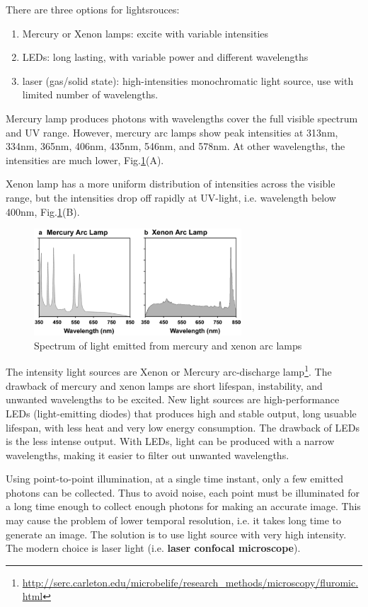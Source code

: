 There are three options for lightsrouces: 
\begin{enumerate}
  \item Mercury or Xenon lamps: excite with variable intensities
  \item LEDs: long lasting, with variable power and different wavelengths
  \item laser (gas/solid state): high-intensities monochromatic light source,
  use with limited number of wavelengths.
\end{enumerate}

Mercury lamp produces photons with wavelengths cover the full visible spectrum
and UV range. However, mercury arc lamps show peak intensities at 313nm, 334nm,
365nm, 406nm, 435nm, 546nm, and 578nm. At other wavelengths, the intensities are
much lower, Fig.\ref{fig:light_source}(A). 

Xenon lamp has a more uniform distribution of intensities across the visible
range, but the intensities drop off rapidly at UV-light, i.e. wavelength below
400nm, Fig.\ref{fig:light_source}(B). 

\begin{figure}[hbt]
  \centerline{\includegraphics[height=4cm,
    angle=0]{./images/light_source.eps}}
  \caption{Spectrum of light emitted from mercury and xenon arc lamps}
\label{fig:light_source}
\end{figure}

The intensity light sources are Xenon or Mercury arc-discharge
lamp\footnote{\url{http://serc.carleton.edu/microbelife/research_methods/microscopy/fluromic.html}}.
The drawback of mercury and xenon lamps are short lifespan, instability, and
unwanted wavelengths to be excited. New light sources are high-performance LEDs
(light-emitting diodes) that produces high and stable output, long usuable
lifespan, with less heat and very low energy consumption. The drawback of LEDs
is the less intense output. With LEDs, light can be produced with a narrow
wavelengths, making it easier to filter out unwanted wavelengths.

Using point-to-point illumination, at a single time instant, only a few emitted
photons can be collected. Thus to avoid noise, each point must be illuminated
for a long time enough to collect enough photons for making an accurate image.
This may cause the problem of lower temporal resolution, i.e. it takes long time
to generate an image. The solution is to use light source with very high
intensity. The modern choice is laser light (i.e. {\bf laser confocal
microscope}). 

